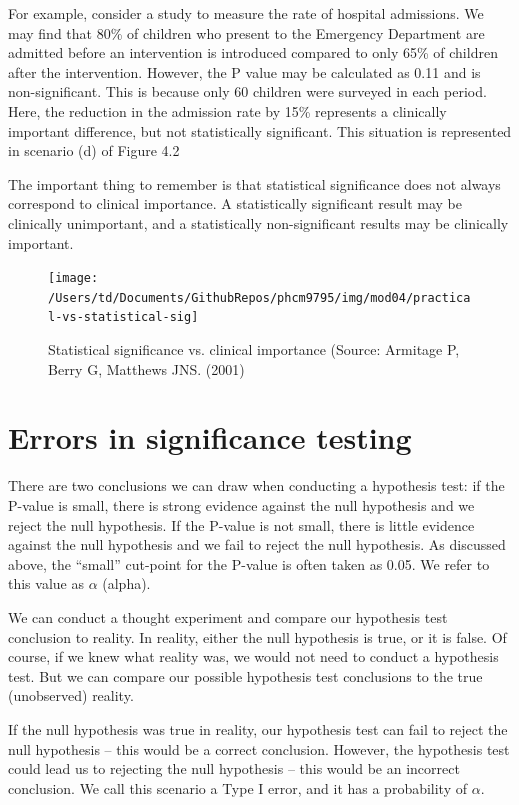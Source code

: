\documentclass[
]{memoir}
\begin{document}
For example, consider a study to measure the rate of hospital admissions. We may find that 80\% of children who present to the Emergency Department are admitted before an intervention is introduced compared to only 65\% of children after the intervention. However, the P value may be calculated as 0.11 and is non-significant. This is because only 60 children were surveyed in each period. Here, the reduction in the admission rate by 15\% represents a clinically important difference, but not statistically significant. This situation is represented in scenario (d) of Figure 4.2

The important thing to remember is that statistical significance does not always correspond to clinical importance. A statistically significant result may be clinically unimportant, and a statistically non-significant results may be clinically important.

\begin{figure}
\texttt{[image: /Users/td/Documents/GithubRepos/phcm9795/img/mod04/practical-vs-statistical-sig]} \caption{Statistical significance vs. clinical importance (Source: Armitage P, Berry G, Matthews JNS. (2001)}\label{fig:practical-importance}
\end{figure}

\hypertarget{errors-in-significance-testing}{%
\section{Errors in significance testing}\label{errors-in-significance-testing}}

There are two conclusions we can draw when conducting a hypothesis test: if the P-value is small, there is strong evidence against the null hypothesis and we reject the null hypothesis. If the P-value is not small, there is little evidence against the null hypothesis and we fail to reject the null hypothesis. As discussed above, the ``small'' cut-point for the P-value is often taken as 0.05. We refer to this value as \(\alpha\) (alpha).

We can conduct a thought experiment and compare our hypothesis test conclusion to reality. In reality, either the null hypothesis is true, or it is false. Of course, if we knew what reality was, we would not need to conduct a hypothesis test. But we can compare our possible hypothesis test conclusions to the true (unobserved) reality.

If the null hypothesis was true in reality, our hypothesis test can fail to reject the null hypothesis -- this would be a correct conclusion. However, the hypothesis test could lead us to rejecting the null hypothesis -- this would be an incorrect conclusion. We call this scenario a Type I error, and it has a probability of \(\alpha\).
\end{document}
